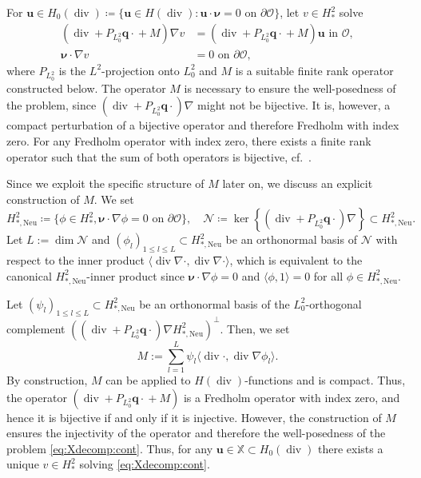 \documentclass{m2an}
\newcommand{\inner}[1]{\langle #1 \rangle}
\newcommand{\dom}{\mathcal{O}} %
\newcommand{\nv}{\boldsymbol{\nu}}
\renewcommand{\u}{\mathbf{u}}
\newcommand{\q}{\mathbf{q}} %
\renewcommand{\div}{\operatorname{div}}
\newcommand{\X}{\mathbb{X}}
\newcommand{\divPqM}{( \div + P_{L^2_0} \q \cdot \! + M )}
\newcommand{\divPq}{( \div + P_{L^2_0} \q \cdot )}
\theoremstyle{plain}
\theoremstyle{definition}
\begin{document}
For $\u \in H_0(\div) \coloneqq \{ \u \in H(\div) : \u \cdot \nv = 0 \text{ on } \partial \dom\}$, let $v \in H^2_{\ast}$ solve
\begin{equation}\label{eq:Xdecomp:cont}
   \begin{aligned}
      \divPqM \nabla v &= \divPqM \u  \text{ in } \dom,\\
      \nv \cdot \nabla v &= 0 \text{ on } \partial \dom,
   \end{aligned}
\end{equation}
where $P_{L^2_0}$ is the $L^2$-projection onto $L^2_0$ and $M$ is a suitable finite rank operator constructed below. The operator $M$ is necessary to ensure the well-posedness of the problem, since $\divPq \nabla$ might not be bijective.
It is, however, a compact perturbation of a bijective operator and therefore Fredholm with index zero. For any Fredholm operator with index zero, there exists a finite rank operator such that the sum of both operators is bijective, cf.~\cite[Thm.~5.3]{GGK90}. 

Since we exploit the specific structure of $M$ later on, we discuss an explicit construction of $M$. We set 
\begin{equation*}
   H^2_{\ast,\text{Neu}} \coloneqq \{ \phi \in H^2_{\ast}, \nv \cdot \nabla \phi = 0 \text{ on } \partial \dom \}, \quad \mathcal{N} \coloneqq \ker \left\{ \divPq \nabla \right\} \subset  H^2_{\ast,\text{Neu}}.
\end{equation*}
Let $L := \dim \mathcal{N}$ and $(\phi_{l})_{1 \le l \le L} \subset H^2_{\ast,\text{Neu}}$ be an orthonormal basis of $\mathcal{N}$ with respect to the inner product $\inner{\div \nabla \cdot, \div \nabla \cdot}$, which is equivalent to the canonical $H^2_{\ast,\text{Neu}}$-inner product since $\nv \cdot \nabla \phi = 0$ and $\inner{\phi,1} = 0$ for all $\phi \in H^2_{\ast,\text{Neu}}$. 

Let $(\psi_{l})_{1 \le l \le L} \subset H^2_{\ast,\text{Neu}}$ be an orthonormal basis of the $L^2_0$-orthogonal complement $\left( \divPq \nabla H^2_{\ast,\text{Neu}}\right)^{\perp}$. Then, we set 
\begin{equation}\label{eq:def:M}
   M := \sum_{l = 1}^L \psi_{l} \inner{\div \cdot, \div \nabla \phi_{l}}.
\end{equation}
By construction, $M$ can be applied to $H(\div)$-functions and is compact. Thus, the operator $\divPqM$ is a Fredholm operator with index zero, and hence it is bijective if and only if it is injective. However, the construction of $M$ ensures the injectivity of the operator and therefore the well-posedness of the problem \eqref{eq:Xdecomp:cont}. Thus, for any $\u \in \X \subset H_0(\div)$ there exists a unique $v \in H^2_{\ast}$ solving \eqref{eq:Xdecomp:cont}.
\end{document}
